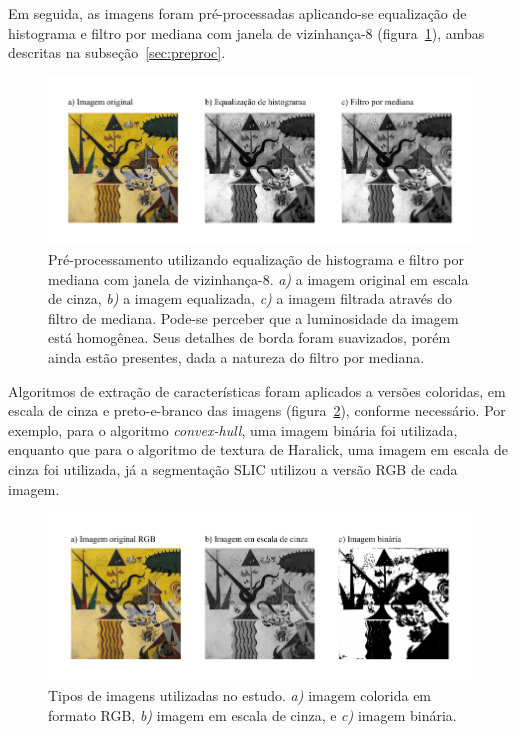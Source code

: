 Em seguida, as imagens foram pré-processadas aplicando-se equalização
de histograma e filtro por mediana com janela de vizinhança-8
(figura~\ref{fig:eq}), ambas descritas na subseção~\ref{sec:preproc}.

\begin{figure}[ht!]
\begin{center}
         \caption{Pré-processamento utilizando equalização de histograma
        e filtro por mediana com janela de vizinhança-8. \textit{a)} a
        imagem original em escala de cinza, \textit{b)} a imagem
        equalizada, \textit{c)} a imagem filtrada através do filtro de
        mediana. Pode-se perceber que a luminosidade da imagem está
        homogênea. Seus detalhes de borda foram suavizados, porém ainda estão presentes, dada a natureza do filtro por mediana.}
        \label{fig:eq}
        \includegraphics[scale=1.2]{figs/passos_eq}
     \fonteminha
\end{center}
\end{figure}

Algoritmos de extração de características foram aplicados a versões
coloridas, em escala de cinza e preto-e-branco das imagens
(figura~\ref{fig:tipos}), conforme necessário. Por exemplo, para o algoritmo
\textit{convex-hull}, uma imagem binária foi utilizada, enquanto que para o
algoritmo de textura de Haralick, uma imagem em escala de cinza foi
utilizada, já a segmentação SLIC utilizou a versão RGB de cada
imagem.

\begin{figure}[ht!]
\begin{center}
         \caption{Tipos de imagens utilizadas no estudo. \textit{a)}
        imagem colorida em formato RGB, \textit{b)} imagem em
        escala de cinza, e \textit{c)} imagem bi\-ná\-ria.}
        \label{fig:tipos}
        \includegraphics[scale=1.2]{figs/passos_tipos}
       \fonteminha
\end{center}
\end{figure}

